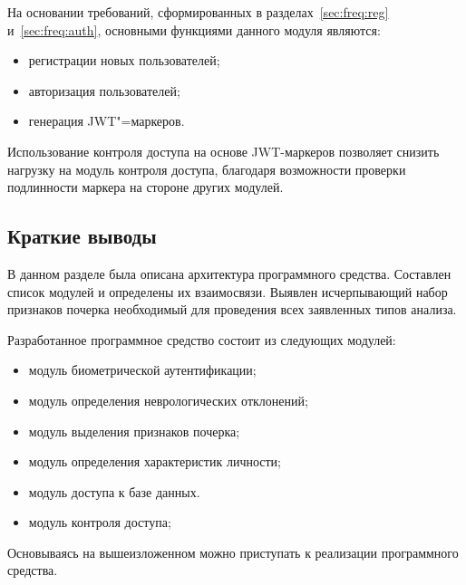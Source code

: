 На основании требований, сформированных в разделах~\ref{sec:freq:reg} и~\ref{sec:freq:auth}, основными функциями данного модуля являются:
\begin{itemize}
  \item регистрации новых пользователей;
  \item авторизация пользователей;
  \item генерация JWT"=маркеров.
\end{itemize}

Использование контроля доступа на основе JWT-маркеров позволяет снизить нагрузку на модуль контроля доступа, благодаря возможности проверки подлинности маркера на стороне других модулей.

\subsection{Краткие выводы}
В данном разделе была описана архитектура программного средства. Составлен список модулей и определены их взаимосвязи.  Выявлен исчерпывающий набор признаков почерка необходимый для проведения всех заявленных типов анализа.

Разработанное программное средство состоит из следующих модулей:
\begin{itemize}
    \item модуль биометрической аутентификации;
    \item модуль определения неврологических отклонений;
    \item модуль выделения признаков почерка;
    \item модуль определения характеристик личности;
    \item модуль доступа к базе данных.
    \item модуль контроля доступа;
\end{itemize}

Основываясь на вышеизложенном можно приступать к реализации программного средства.